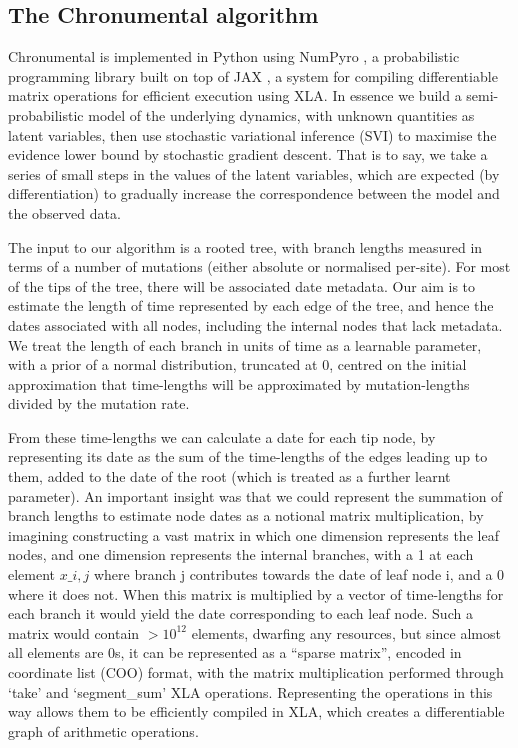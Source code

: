 \subsection*{The Chronumental algorithm}

Chronumental is implemented in Python using NumPyro \citep{phan2019composable}, a probabilistic programming library built on top of JAX \citep{jax2018github}, a system for compiling differentiable matrix operations for efficient execution using XLA. In essence we build a semi-probabilistic model of the underlying dynamics, with unknown quantities as latent variables, then use stochastic variational inference (SVI) to maximise the evidence lower bound by stochastic gradient descent. That is to say, we take a series of small steps in the values of the latent variables, which are expected (by differentiation) to gradually increase the correspondence between the model and the observed data.

The input to our algorithm is a rooted tree, with branch lengths measured in terms of a number of mutations (either absolute or normalised per-site). For most of the tips of the tree, there will be associated date metadata. Our aim is to estimate the length of time represented by each edge of the tree, and hence the dates associated with all nodes, including the internal nodes that lack metadata. We treat the length of each branch in units of time as a learnable parameter, with a prior of a normal distribution, truncated at 0, centred on the initial approximation that time-lengths will be approximated by mutation-lengths divided by the mutation rate. 

From these time-lengths we can calculate a date for each tip node, by representing its date as the sum of the time-lengths of the edges leading up to them, added to the date of the root (which is treated as a further learnt parameter). An important insight was that we could represent the summation of branch lengths to estimate node dates as a notional matrix multiplication, by imagining constructing a vast matrix in which one dimension represents the leaf nodes, and one dimension represents the internal branches, with a 1 at each element $x\_{i,j}$ where branch j contributes towards the date of leaf node i, and a 0 where it does not. When this matrix is multiplied by a vector of time-lengths for each branch it would yield the date corresponding to each leaf node.  Such a matrix would contain $>10^{12}$ elements, dwarfing any resources, but since almost all elements are 0s, it can be represented as a ``sparse matrix'', encoded in coordinate list (COO) format, with the matrix multiplication performed through `take' and `segment\_sum' XLA operations. Representing the operations in this way allows them to be efficiently compiled in XLA, which creates a differentiable graph of arithmetic operations. 


